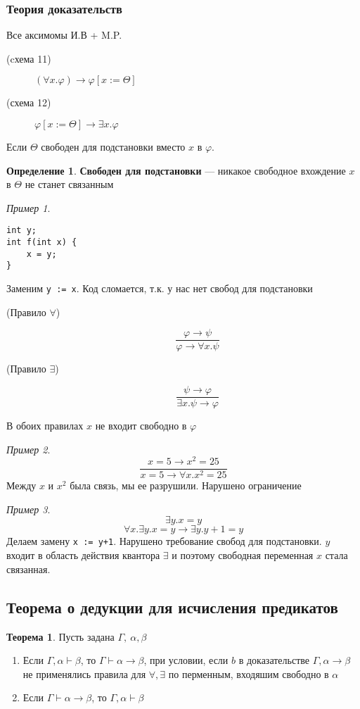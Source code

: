 \documentclass[english]{article}
\theoremstyle{plain}
\theoremstyle{remark}
\newtheorem*{examp}{Пример}
\theoremstyle{definition}
\newtheorem{theorem}{Теорема}[section]
\newtheorem*{definition}{Определение}
\begin{document}
\subsubsection{Теория доказательств}
\label{sec:org352eea1}
Все аксимомы И.В + M.P.
\begin{description}
\item[{(cхема 11)}] \((\forall x. \varphi) \to \varphi[x:=\Theta]\)
\item[{(схема 12)}] \(\varphi[x:=\Theta]\to \exists x. \varphi\)
\end{description}
Если \(\Theta\) свободен для подстановки вместо \(x\) в \(\varphi\).
\begin{definition}
\textbf{Свободен для подстановки} --- никакое свободное вхождение \(x\) в \(\Theta\) не станет связанным
\end{definition}
\begin{examp}
\-
\begin{verbatim}
int y;
int f(int x) {
	x = y;
}
\end{verbatim}
Заменим \texttt{y := x}. Код сломается, т.к. у нас нет свобод для подстановки
\end{examp}
\begin{description}
\item[{(Правило \(\forall\))}] \[\frac{\varphi \to \psi}{\varphi \to \forall x. \psi}\]
\item[{(Правило \(\exists\))}] \[ \frac{\psi \to \varphi}{\exists x.\psi \to \varphi} \]
\end{description}
В обоих правилах \(x\) не входит свободно в \(\varphi\)
\begin{examp}
\[ \frac{x = 5 \to x^2 = 25}{x = 5 \to \forall x. x^2 = 25} \]
Между \(x\) и \(x^2\) была связь, мы ее разрушили. Нарушено ограничение
\end{examp}
\begin{examp}
\[ \exists y. x = y \]
\[ \forall x. \exists y. x = y \to \exists y. y + 1 = y \]
Делаем замену \texttt{x := y+1}. Нарушено требование свобод для подстановки. \(y\) входит в область действия квантора \(\exists\) и поэтому свободная переменная \(x\) стала связанная.
\end{examp}
\subsection{Теорема о дедукции для исчисления предикатов}
\label{sec:orgb88bfe1}
\begin{theorem}
Пусть задана \(\Gamma,\ \alpha,\beta\)
\begin{enumerate}
\item Если \(\Gamma, \alpha \vdash \beta\), то \(\Gamma \vdash \alpha \to \beta\), при условии, если \(b\) в доказательстве \(\Gamma, \alpha \to \beta\) не применялись правила для \(\forall, \exists\) по перменным, входяшим свободно в \(\alpha\)
\item Если \(\Gamma \vdash \alpha \to \beta\), то \(\Gamma, \alpha \vdash \beta\)
\end{enumerate}
\label{org209fb4e}
\end{theorem}
\end{document}
